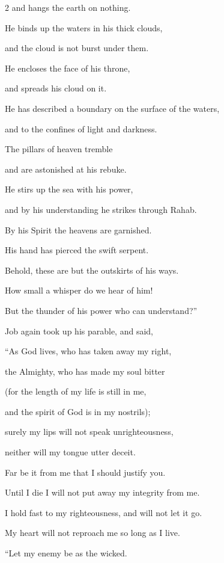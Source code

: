 \begin{multicols}{2}
	and hangs the earth on nothing.
	
	\myverse{}He binds up the waters in his thick clouds,
	
	and the cloud is not burst under them.
	
	\myverse{}He encloses the face of his throne,
	
	and spreads his cloud on it.
	
	\myverse{}He has described a boundary on the surface of the waters,
	
	and to the confines of light and darkness.
	
	\myverse{}The pillars of heaven tremble
	
	and are astonished at his rebuke.
	
	\myverse{}He stirs up the sea with his power,
	
	and by his understanding he strikes through Rahab.
	
	\myverse{}By his Spirit the heavens are garnished.
	
	His hand has pierced the swift serpent.
	
	\myverse{}Behold, these are but the outskirts of his ways.
	
	How small a whisper do we hear of him!
	
	But the thunder of his power who can understand?”
	
	
	\mychapter{} \myverse*{}Job again took up his parable, and said,
	
	\quad\quad \myverse{}“As God lives, who has taken away my right,
	
	the Almighty, who has made my soul bitter
	
	\myverse{}(for the length of my life is still in me,
	
	and the spirit of God is in my nostrils);
	
	\myverse{}surely my lips will not speak unrighteousness,
	
	neither will my tongue utter deceit.
	
	\myverse{}Far be it from me that I should justify you.
	
	Until I die I will not put away my integrity from me.
	
	\myverse{}I hold fast to my righteousness, and will not let it go.
	
	My heart will not reproach me so long as I live.
	
		\vspace{\baselineskip}
	
	\myverse{}“Let my enemy be as the wicked.
	

\end{multicols}

